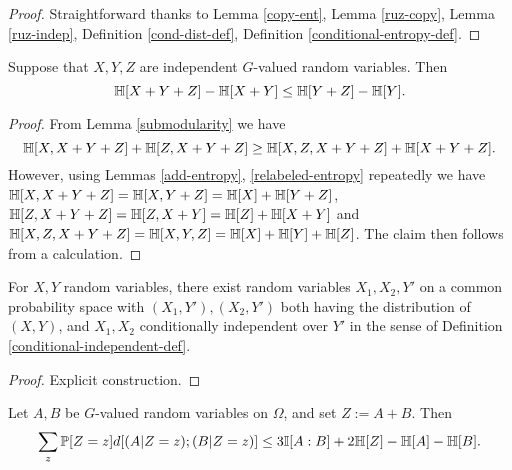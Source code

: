 \begin{proof}\leanok Straightforward thanks to Lemma \ref{copy-ent}, Lemma \ref{ruz-copy}, Lemma \ref{ruz-indep}, Definition \ref{cond-dist-def}, Definition \ref{conditional-entropy-def}.
\end{proof}

\begin{lemma}\label{kv}
  \leanok
Suppose that $X, Y, Z$ are independent $G$-valued random variables. Then
\[
  \mathbb{H}[X + Y + Z] - \mathbb{H}[X + Y] \leq \mathbb{H}[Y+ Z] - \mathbb{H}[Y].
\]
\end{lemma}

\begin{proof}\leanok
From Lemma \ref{submodularity} we have
$$ \mathbb{H}[X, X + Y+ Z] + \mathbb{H}[Z, X + Y+ Z] \geq \mathbb{H}[X, Z, X + Y+ Z] + \mathbb{H}[X + Y+ Z].$$
However, using Lemmas \ref{add-entropy}, \ref{relabeled-entropy} repeatedly we have $\mathbb{H}[X, X + Y+ Z] = \mathbb{H}[X, Y+ Z] = \mathbb{H}[X] + \mathbb{H}[Y+ Z]$, $\mathbb{H}[Z, X + Y + Z] = \mathbb{H}[Z, X + Y] = \mathbb{H}[Z] + \mathbb{H}[X + Y]$ and $\mathbb{H}[X, Z, X + Y+ Z] = \mathbb{H}[X, Y, Z] = \mathbb{H}[X] + \mathbb{H}[Y] + \mathbb{H}[Z]$.  The claim then follows from a calculation.
\end{proof}

\begin{lemma}\label{cond-indep-exist}
  \leanok
  For $X,Y$ random variables, there exist random variables $X_1,X_2,Y'$ on a common probability space with $(X_1, Y'), (X_2, Y')$ both having the distribution of $(X,Y)$, and $X_1, X_2$ conditionally independent over $Y'$ in the sense of Definition \ref{conditional-independent-def}.
\end{lemma}

\begin{proof}\leanok Explicit construction.
\end{proof}


\begin{lemma}\label{entropic-bsg}
  \leanok
  Let $A,B$ be $G$-valued random variables on $\Omega$, and set $Z := A+B$.
Then
\begin{equation}\label{2-bsg-takeaway} \sum_{z}  \mathbb{P}[Z=z] d[(A | Z = z); (B | Z = z)] \leq 3  \mathbb{I}[A:B] + 2 \mathbb{H}[Z] - \mathbb{H}[A] - \mathbb{H}[B]. \end{equation}
\end{lemma}

